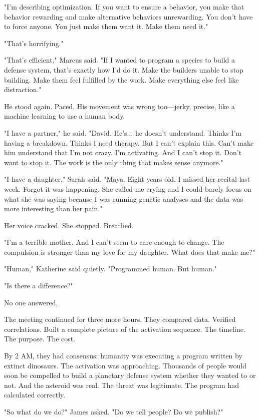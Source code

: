 "I'm describing optimization. If you want to ensure a behavior, you make that behavior rewarding and make alternative behaviors unrewarding. You don't have to force anyone. You just make them want it. Make them need it."

"That's horrifying."

"That's efficient," Marcus said. "If I wanted to program a species to build a defense system, that's exactly how I'd do it. Make the builders unable to stop building. Make them feel fulfilled by the work. Make everything else feel like distraction."

He stood again. Paced. His movement was wrong too—jerky, precise, like a machine learning to use a human body.

"I have a partner," he said. "David. He's... he doesn't understand. Thinks I'm having a breakdown. Thinks I need therapy. But I can't explain this. Can't make him understand that I'm not crazy. I'm activating. And I can't stop it. Don't want to stop it. The work is the only thing that makes sense anymore."

"I have a daughter," Sarah said. "Maya. Eight years old. I missed her recital last week. Forgot it was happening. She called me crying and I could barely focus on what she was saying because I was running genetic analyses and the data was more interesting than her pain."

Her voice cracked. She stopped. Breathed.

"I'm a terrible mother. And I can't seem to care enough to change. The compulsion is stronger than my love for my daughter. What does that make me?"

"Human," Katherine said quietly. "Programmed human. But human."

"Is there a difference?"

No one answered.

The meeting continued for three more hours. They compared data. Verified correlations. Built a complete picture of the activation sequence. The timeline. The purpose. The cost.

By 2 AM, they had consensus: humanity was executing a program written by extinct dinosaurs. The activation was approaching. Thousands of people would soon be compelled to build a planetary defense system whether they wanted to or not. And the asteroid was real. The threat was legitimate. The program had calculated correctly.

"So what do we do?" James asked. "Do we tell people? Do we publish?"

